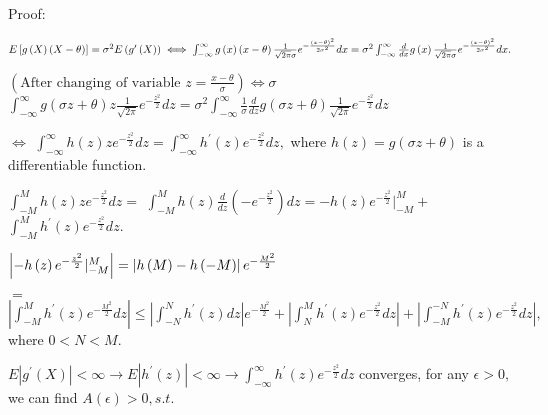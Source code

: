 \documentclass{article}
\begin{document}

Proof: 

$E\left[ g\left( X\right) \left( X-\theta \right) \right] =\sigma
^{2}E\left( g^{\prime }\left( X\right) \right) \iff \int_{-\infty }^{\infty
}g\left( x\right) \left( x-\theta \right) \frac{1}{\sqrt{2\pi }\sigma }e^{-%
\frac{\left( x-\theta \right) ^{2}}{2\sigma ^{2}}}dx=\sigma
^{2}\int_{-\infty }^{\infty }\frac{d}{dx}g\left( x\right) \frac{1}{\sqrt{%
2\pi }\sigma }e^{-\frac{\left( x-\theta \right) ^{2}}{2\sigma ^{2}}}dx.$

$\left( \text{After changing of variable }z=\frac{x-\theta }{\sigma }\right)
\iff \sigma $ $\int_{-\infty }^{\infty }g\left( \sigma z+\theta \right) z%
\frac{1}{\sqrt{2\pi }}e^{-\frac{z^{2}}{2}}dz=\sigma ^{2}\int_{-\infty
}^{\infty }\frac{1}{\sigma }\frac{d}{dz}g\left( \sigma z+\theta \right) 
\frac{1}{\sqrt{2\pi }}e^{-\frac{z^{2}}{2}}dz$

$\iff $ $\int_{-\infty }^{\infty }h\left( z\right) ze^{-\frac{z^{2}}{2}%
}dz=\int_{-\infty }^{\infty }h^{\prime }\left( z\right) e^{-\frac{z^{2}}{2}%
}dz,$ where $h\left( z\right) =g\left( \sigma z+\theta \right) $ is a
differentiable function.

$\int_{-M}^{M}h\left( z\right) ze^{-\frac{z^{2}}{2}}dz=$ $%
\int_{-M}^{M}h\left( z\right) \frac{d}{dz}\left( -e^{-\frac{z^{2}}{2}%
}\right) dz=-h\left( z\right) e^{-\frac{z^{2}}{2}}|_{-M}^{M}+$ $%
\int_{-M}^{M}h^{\prime }\left( z\right) e^{-\frac{z^{2}}{2}}dz.$

$\left\vert -h\left( z\right) e^{-\frac{z^{2}}{2}}|_{-M}^{M}\right\vert
=\left\vert h\left( M\right) -h\left( -M\right) \right\vert e^{-\frac{M^{2}}{%
2}}$

$=$ $\left\vert \int_{-M}^{M}h^{\prime }\left( z\right) e^{-\frac{M^{2}}{2}%
}dz\right\vert \leq \left\vert \int_{-N}^{N}h^{\prime }\left( z\right)
dz\right\vert e^{-\frac{M^{2}}{2}}+\left\vert \int_{N}^{M}h^{\prime }\left(
z\right) e^{-\frac{z^{2}}{2}}dz\right\vert +\left\vert
\int_{-M}^{-N}h^{\prime }\left( z\right) e^{-\frac{z^{2}}{2}}dz\right\vert ,$%
where 0$<N<M.$

$E\left\vert g^{\prime }\left( X\right) \right\vert <\infty \rightarrow
E\left\vert h^{\prime }\left( z\right) \right\vert <\infty \rightarrow
\int_{-\infty }^{\infty }h^{\prime }\left( z\right) e^{-\frac{z^{2}}{2}}dz$
converges, for any $\epsilon >0,$we can find $A\left( \epsilon \right)
>0,s.t.$
\end{document}
